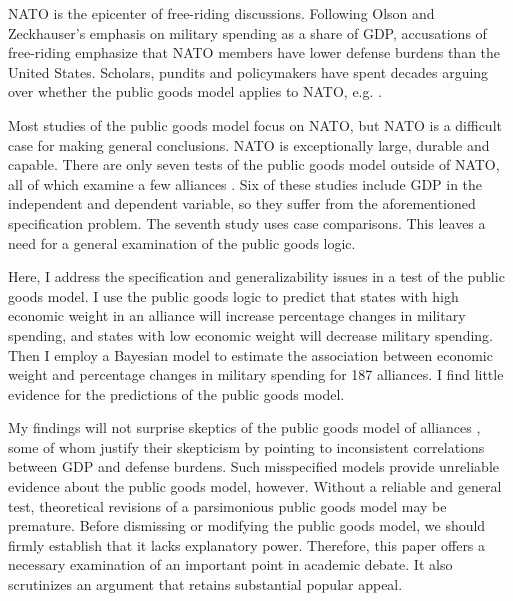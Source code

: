 \documentclass[12pt]{article}
\begin{document}
NATO is the epicenter of free-riding discussions. 
Following Olson and Zeckhauser's emphasis on military spending as a share of GDP, accusations of free-riding emphasize that NATO members have lower defense burdens than the United States. 
Scholars, pundits and policymakers have spent decades arguing over whether the public goods model applies to NATO, e.g. \citep{SandlerForbes1980, Palmer1990, Boyer1993, GatesTerasawa1992, SandlerHartley2001, Lanoszka2015, PluemperNeumayer2015}.


Most studies of the public goods model focus on NATO, but NATO is a difficult case for making general conclusions. 
NATO is exceptionally large, durable and capable. 
There are only seven tests of the public goods model outside of NATO, all of which examine a few alliances \citep{Russett1970, Starr1974, Reisinger1983, Thies1987, ConybeareSandler1990, OnealWhatley1996, Siroky2012}. 
Six of these studies include GDP in the independent and dependent variable, so they suffer from the aforementioned specification problem.
The seventh study uses case comparisons.
This leaves a need for a general examination of the public goods logic. 


Here, I address the specification and generalizability issues in a test of the public goods model.  
I use the public goods logic to predict that states with high economic weight in an alliance will increase percentage changes in military spending, and states with low economic weight will decrease military spending.
Then I employ a Bayesian model to estimate the association between economic weight and percentage changes in military spending for 187 alliances. 
I find little evidence for the predictions of the public goods model. 


My findings will not surprise skeptics of the public goods model of alliances \citep{Palmer1990, GatesTerasawa1992, SandlerHartley2001, Norrlof2010, NiouZeigler2019}, some of whom justify their skepticism by pointing to inconsistent correlations between GDP and defense burdens. 
Such misspecified models provide unreliable evidence about the public goods model, however. 
Without a reliable and general test, theoretical revisions of a parsimonious public goods model may be premature.
Before dismissing or modifying the public goods model, we should firmly establish that it lacks explanatory power.
Therefore, this paper offers a necessary examination of an important point in academic debate.
It also scrutinizes an argument that retains substantial popular appeal. 
\end{document}
